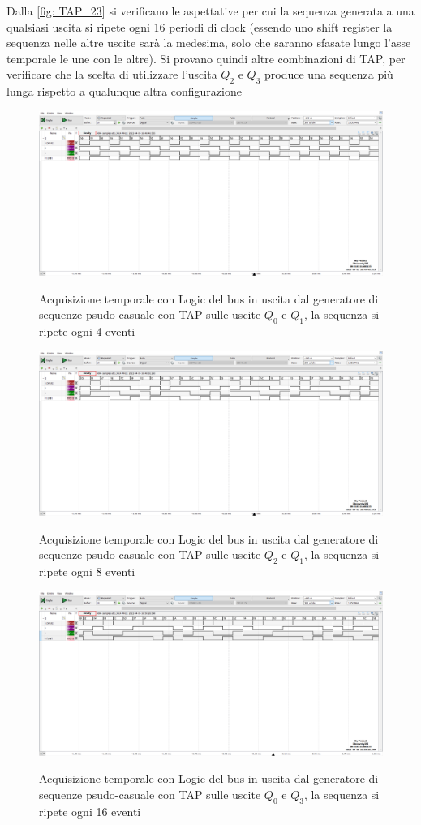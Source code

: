 \documentclass[10pt, a4paper, italian]{article}
\begin{document}
Dalla \cref{fig: TAP_23} si verificano le aspettative per cui la sequenza generata a una qualsiasi uscita si ripete ogni 16 periodi di clock (essendo uno shift register la sequenza nelle altre uscite sarà la medesima, solo che saranno sfasate lungo l'asse temporale le une con le altre).
Si provano quindi altre combinazioni di TAP, per verificare che la scelta di utilizzare l'uscita $Q_2$ e $Q_3$ produce una sequenza più lunga rispetto a qualunque altra configurazione
\begin{figure}
	\includegraphics[width=\textwidth]{4.b_10}
	\label{fig: TAP_10}
	\caption{Acquisizione temporale con Logic del bus in uscita dal generatore di sequenze psudo-casuale con TAP sulle uscite $Q_0$ e $Q_1$, la sequenza si ripete ogni 4 eventi}
\end{figure}
\begin{figure}
	\includegraphics[width=\textwidth]{4.b_21}
	\label{fig: TAP_21}
	\caption{Acquisizione temporale con Logic del bus in uscita dal generatore di sequenze psudo-casuale con TAP sulle uscite $Q_2$ e $Q_1$, la sequenza si ripete ogni 8 eventi}
\end{figure}
\begin{figure}
	\includegraphics[width=\textwidth]{4.b_30}
	\label{fig: TAP_30}
	\caption{Acquisizione temporale con Logic del bus in uscita dal generatore di sequenze psudo-casuale con TAP sulle uscite $Q_0$ e $Q_3$, la sequenza si ripete ogni 16 eventi}
\end{figure}
\end{document}
